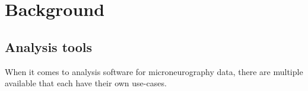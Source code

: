 \chapter{Background}


\section{Analysis tools}
When it comes to analysis software for microneurography data,  there are multiple available that each have their own use-cases.

